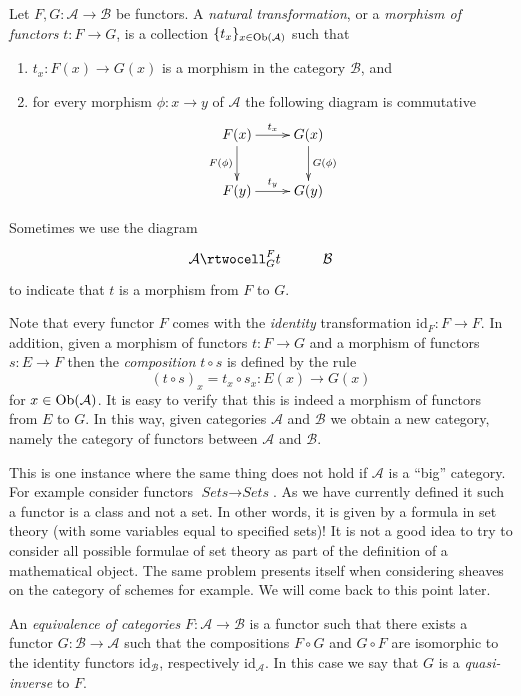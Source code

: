 \begin{definition}
\label{definition-transformation-functors}
Let $F, G : \mathcal{A} \to \mathcal{B}$ be functors.
A {\it natural transformation}, or a {\it morphism of functors}
$t : F \to G$, is a collection $\{t_x\}_{x\in \mathop{\mathrm{Ob}}\nolimits(\mathcal{A})}$
such that
\begin{enumerate}
\item $t_x : F(x) \to G(x)$ is a morphism in the category $\mathcal{B}$, and
\item for every morphism $\phi : x \to y$ of $\mathcal{A}$ the following
diagram is commutative
$$
\xymatrix{
F(x) \ar[r]^{t_x} \ar[d]_{F(\phi)} & G(x) \ar[d]^{G(\phi)} \\
F(y) \ar[r]^{t_y} & G(y) }
$$
\end{enumerate}
\end{definition}

\noindent
Sometimes we use the diagram
$$
\xymatrix{
\mathcal{A}
\rtwocell^F_G{t}
&
\mathcal{B}
}
$$
to indicate that $t$ is a morphism from $F$ to $G$.

\medskip\noindent
Note that every functor $F$ comes with the {\it identity} transformation
$\text{id}_F : F \to F$. In addition, given a morphism of
functors $t : F \to G$ and a morphism of functors $s : E \to F$
then the {\it composition} $t \circ s$ is defined by the rule
$$
(t \circ s)_x = t_x \circ s_x : E(x) \to G(x)
$$
for $x \in \mathop{\mathrm{Ob}}\nolimits(\mathcal{A})$.
It is easy to verify that this is indeed a morphism of functors
from $E$ to $G$.
In this way, given categories
$\mathcal{A}$ and $\mathcal{B}$ we obtain a new category,
namely the category of functors between $\mathcal{A}$ and
$\mathcal{B}$.

\begin{remark}
\label{remark-functors-sets-sets}
This is one instance where the same thing does not hold if
$\mathcal{A}$ is a ``big'' category. For example consider
functors $\textit{Sets} \to \textit{Sets}$. As we have currently
defined it such a functor is a class and not a set. In other
words, it is given by a formula in set theory (with some variables
equal to specified sets)! It is not a good idea to try to consider
all possible formulae of set theory as part of the definition of
a mathematical object. The same problem presents itself when
considering sheaves on the category of schemes for example.
We will come back to this point later.
\end{remark}

\begin{definition}
\label{definition-equivalence-categories}
An {\it equivalence of categories}
$F : \mathcal{A} \to \mathcal{B}$ is a functor such that there
exists a functor $G : \mathcal{B} \to \mathcal{A}$ such that
the compositions $F \circ G$ and $G \circ F$ are isomorphic to the
identity functors $\text{id}_\mathcal{B}$,
respectively $\text{id}_\mathcal{A}$.
In this case we say that $G$ is a {\it quasi-inverse} to $F$.
\end{definition}

